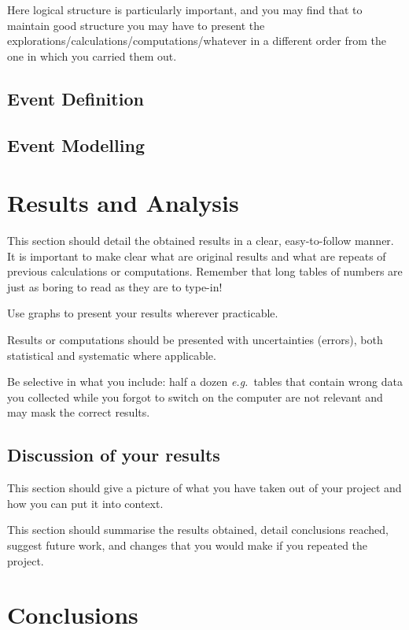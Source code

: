 \documentclass[12pt,a4paper]{report}
\begin{document}
Here logical structure is particularly important, and you may find
that to maintain good structure you may have to present the
explorations/calculations/computations/whatever in a different order
from the one in which you carried them out.

\section{Event Definition}\label{sec:def}

\section{Event Modelling}\label{sec:model}

\chapter{Results and Analysis}\label{ch:results}

This section should detail the obtained results in a clear,
easy-to-follow manner. It is important to make clear what are original
results and what are repeats of previous calculations or computations.
Remember that long tables of numbers are just as boring to read as
they are to type-in!

Use graphs to present your results wherever practicable.

Results or computations should be presented with uncertainties
(errors), both statistical and systematic where applicable.

Be selective in what you include: half a dozen \emph{e.g.}~tables that
contain wrong data you collected while you forgot to switch on the
computer are not relevant and may mask the correct results.

\section{Discussion of your results}\label{sec:discussion}

This section should give a picture of what you have taken out of your
project and how you can put it into context.

This section should summarise the results obtained, detail conclusions
reached, suggest future work, and changes that you would make if you
repeated the project.

\chapter{Conclusions}\label{ch:conclusions}
\end{document}
